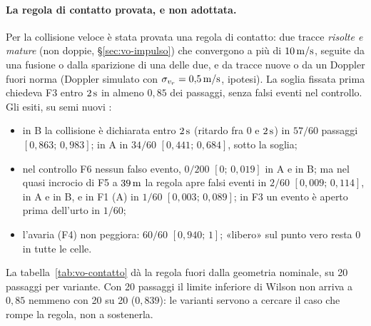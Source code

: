 \paragraph{La regola di contatto provata, e non adottata.} Per la collisione veloce è stata provata una regola di contatto: due tracce \emph{risolte e mature} (non doppie, \S\ref{sec:vo-impulso}) che convergono a più di $10\,\mathrm{m/s}$, seguite da una fusione o dalla sparizione di una delle due, e da tracce nuove o da un Doppler fuori norma (Doppler simulato con $\sigma_{v_r}=0{,}5\,\mathrm{m/s}$, ipotesi). La soglia fissata prima chiedeva F3 entro $2\,\mathrm{s}$ in almeno $0{,}85$ dei passaggi, senza falsi eventi nel controllo. Gli esiti, su semi nuovi :
\begin{itemize}
\item in B la collisione è dichiarata entro $2\,\mathrm{s}$ (ritardo fra $0$ e $2\,\mathrm{s}$) in $57/60$ passaggi $[0{,}863;\,0{,}983]$; in A in $34/60$ $[0{,}441;\,0{,}684]$, sotto la soglia;
\item nel controllo F6 nessun falso evento, $0/200$ $[0;\,0{,}019]$ in A e in B; ma nel quasi incrocio di F5 a $39\,\mathrm{m}$ la regola apre falsi eventi in $2/60$ $[0{,}009;\,0{,}114]$, in A e in B, e in F1 (A) in $1/60$ $[0{,}003;\,0{,}089]$; in F3 un evento è aperto prima dell'urto in $1/60$;
\item l'avaria (F4) non peggiora: $60/60$ $[0{,}940;\,1]$; «libero» sul punto vero resta 0 in tutte le celle.
\end{itemize}
La tabella~\ref{tab:vo-contatto} dà la regola fuori dalla geometria nominale, su 20 passaggi per variante. Con 20 passaggi il limite inferiore di Wilson non arriva a $0{,}85$ nemmeno con 20 su 20 ($0{,}839$): le varianti servono a cercare il caso che rompe la regola, non a sostenerla.

